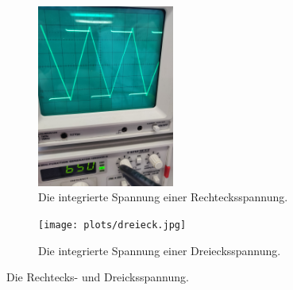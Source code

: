 \begin{figure}
    \centering
    \begin{subfigure}{0.48\textwidth}
        \centering
        \includegraphics[height=6cm,angle=-90]{plots/rechteck.jpg}
        \caption{Die integrierte Spannung einer Rechtecksspannung.}
        \label{fig:int_rechteck}
    \end{subfigure}
    \begin{subfigure}{0.48\textwidth}
        \centering
        \texttt{[image: plots/dreieck.jpg]}
        \caption{Die integrierte Spannung einer Dreiecksspannung.}
        \label{fig:int_dreieck}
    \end{subfigure}
    \caption{Die Rechtecks- und Dreicksspannung.}
    \label{fig:rechtdrei}
\end{figure}
